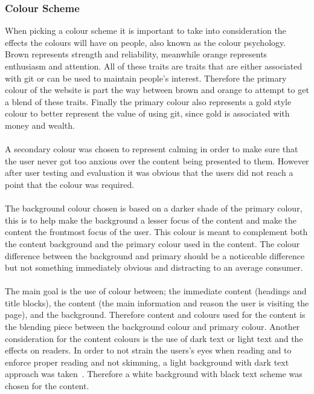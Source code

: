 \subsubsection{Colour Scheme}
When picking a colour scheme it is important to take into consideration the effects the colours will have on people, also known as the colour psychology. Brown represents strength and reliability, meanwhile orange represents enthusiasm and attention. All of these traits are traits that are either associated with \gls{git} or can be used to maintain people's interest. Therefore the primary colour of the website is part the way between brown and orange to attempt to get a blend of these traits. Finally the primary colour also represents a gold style colour to better represent the value of using \gls{git}, since gold is associated with money and wealth.~\cite{colors}\\\\
A secondary colour was chosen to represent calming in order to make sure that the user never got too anxious over the content being presented to them. However after user testing and evaluation it was obvious that the users did not reach a point that the colour was required.~\cite{colors}\\\\
The background colour chosen is based on a darker shade of the primary colour, this is to help make the background a lesser focus of the content and make the content the frontmost focus of the user. This colour is meant to complement both the content background and the primary colour used in the content. The colour difference between the background and primary should be a noticeable difference but not something immediately obvious and distracting to an average consumer.\\\\
The main goal is the use of colour between; the immediate content (headings and title blocks), the content (the main information and reason the user is visiting the page), and the background. Therefore content and colours used for the content is the blending piece between the background colour and primary colour. Another consideration for the content colours is the use of dark text or light text and the effects on readers. In order to not strain the users's eyes when reading and to enforce proper reading and not skimming, a light background with dark text approach was taken~\cite{text}. Therefore a white background with black text scheme was chosen for the content.\\\\
